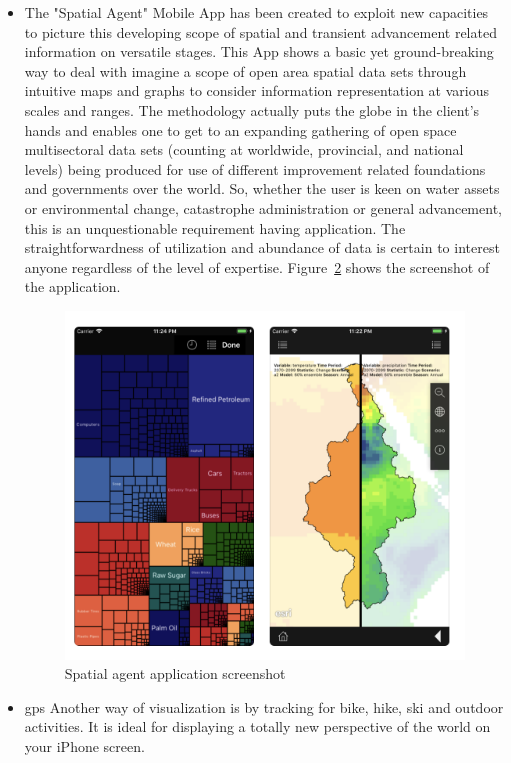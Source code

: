 \begin{itemize}
\begin{figure}[!htb]
\begin{minipage}{0.35\textwidth}
            \caption{Mobile data collection application screenshot - 2 \cite{GIS_cloud_mobile_data_collection}}\label{Fig:mobile_data_collection_2}
        \end{minipage}
\end{figure}

  
  \item The "Spatial Agent" Mobile App has been created to exploit new capacities to picture this developing scope of spatial and transient advancement related information on versatile stages. This App shows a basic yet ground-breaking way to deal with imagine a scope of open area spatial data sets through intuitive maps and graphs to consider information representation at various scales and ranges. The methodology actually puts the globe in the client's hands and enables one to get to an expanding gathering of open space multisectoral data sets (counting at worldwide, provincial, and national levels) being produced for use of different improvement related foundations and governments over the world. So, whether the user is keen on water assets or environmental change, catastrophe administration or general advancement, this is an unquestionable requirement having application. The straightforwardness of utilization and abundance of data is certain to interest anyone regardless of the level of expertise. Figure~\ref{fig:spatial_agent} shows the screenshot of the application. \cite{Spatial_Agent}

  \begin{figure}[H]
            \centering
            \includegraphics[width=0.5\linewidth]{figures/ch1/spatial_agent.png}
            \caption{\label{fig:spatial_agent} Spatial agent application screenshot \cite{Spatial_Agent}}
    \end{figure}
  
  \item \gls{gps} Another way of visualization is by tracking for bike, hike, ski and outdoor activities. It is ideal for displaying a totally new perspective of the world on your iPhone screen.
  

\end{itemize}
